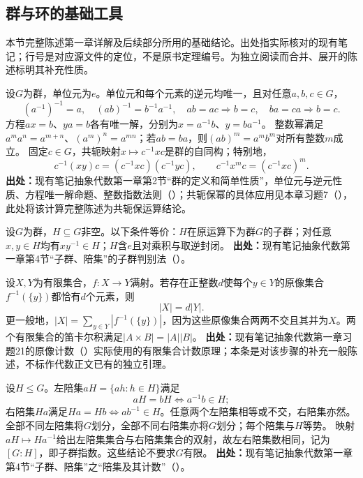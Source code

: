 \subsection{群与环的基础工具}
本节完整陈述第一章详解及后续部分所用的基础结论。出处指实际核对的现有笔记；行号是对应源文件的定位，不是原书定理编号。为独立阅读而合并、展开的陈述标明其补充性质。

\begin{reviewprop}\label{tool:g-laws}
设$G$为群，单位元为$e$。单位元和每个元素的逆元均唯一，且对任意$a,b,c\in G$，
\[
(a^{-1})^{-1}=a,\quad (ab)^{-1}=b^{-1}a^{-1},\quad
ab=ac\Rightarrow b=c,\quad ba=ca\Rightarrow b=c.
\]
方程$ax=b$、$ya=b$各有唯一解，分别为$x=a^{-1}b$、$y=ba^{-1}$。
整数幂满足$a^ma^n=a^{m+n}$、$(a^m)^n=a^{mn}$；若$ab=ba$，则$(ab)^m=a^mb^m$对所有整数$m$成立。
固定$c\in G$，共轭映射$x\mapsto c^{-1}xc$是群的自同构；特别地，
\[
c^{-1}(xy)c=(c^{-1}xc)(c^{-1}yc),\qquad
c^{-1}x^mc=(c^{-1}xc)^m.
\]
\textbf{出处：}现有笔记抽象代数第一章第2节“群的定义和简单性质”，单位元与逆元性质、方程唯一解命题、整数指数法则（）；共轭保幂的具体应用见本章习题7（），此处将该计算完整陈述为共轭保运算结论。
\end{reviewprop}

\begin{reviewtheorem}[子群判别法]\label{tool:g-subgroup}
设$G$为群，$H\subseteq G$非空。以下条件等价：$H$在原运算下为群$G$的子群；对任意$x,y\in H$均有$xy^{-1}\in H$；$H$含$e$且对乘积与取逆封闭。
\textbf{出处：}现有笔记抽象代数第一章第4节“子群、陪集”的子群判别法（）。
\end{reviewtheorem}

\begin{reviewlemma}[有限满射的等纤维计数]\label{tool:g-fiber-count}
设$X,Y$为有限集合，$f:X\to Y$满射。若存在正整数$d$使每个$y\in Y$的原像集合$f^{-1}(\{y\})$都恰有$d$个元素，则
\[
|X|=d|Y|.
\]
更一般地，$|X|=\sum_{y\in Y}|f^{-1}(\{y\})|$，因为这些原像集合两两不交且其并为$X$。两个有限集合的笛卡尔积满足$|A\times B|=|A||B|$。
\textbf{出处：}现有笔记抽象代数第一章习题21的原像计数（）实际使用的有限集合计数原理；本条是对该步骤的补充一般陈述，不标作代数正文已有的独立引理。
\end{reviewlemma}

\begin{reviewprop}[陪集的划分及左右指数]\label{tool:g-cosets}
设$H\leq G$。左陪集$aH=\{ah:h\in H\}$满足
\[
aH=bH\iff a^{-1}b\in H;
\]
右陪集$Ha$满足$Ha=Hb\iff ab^{-1}\in H$。任意两个左陪集相等或不交，右陪集亦然。全部不同左陪集将$G$划分，全部不同右陪集亦将$G$划分；每个陪集与$H$等势。
映射$aH\mapsto Ha^{-1}$给出左陪集集合与右陪集集合的双射，故左右陪集数相同，记为$[G:H]$，即子群指数。这些结论不要求$G$有限。
\textbf{出处：}现有笔记抽象代数第一章第4节“子群、陪集”之“陪集及其计数”（）。
\end{reviewprop}

